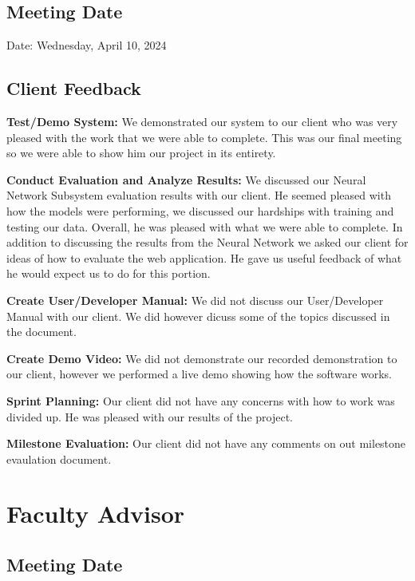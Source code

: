 \documentclass[12pt]{article}
\begin{document}
\subsection{Meeting Date}
Date: Wednesday, April 10, 2024
\subsection{Client Feedback}


\noindent\textbf{Test/Demo System:} We demonstrated our system to our client who was very pleased with the work that
we were able to complete. This was our final meeting so we were able to show him our project in its entirety.

\medskip

\noindent\textbf{Conduct Evaluation and Analyze Results:} We discussed our Neural Network Subsystem evaluation results with our
client. He seemed pleased with how the models were performing, we discussed our hardships with training and testing
our data. Overall, he was pleased with what we were able to complete. In addition to discussing the results from the 
Neural Network we asked our client for ideas of how to evaluate the web application. He gave us useful feedback of what
he would expect us to do for this portion.

\medskip

\noindent\textbf{Create User/Developer Manual:} We did not discuss our User/Developer Manual with our client. We did
however dicuss some of the topics discussed in the document.

\medskip

\noindent\textbf{Create Demo Video:} We did not demonstrate our recorded demonstration to our client, however we performed
a live demo showing how the software works.


\medskip

\noindent\textbf{Sprint Planning:} Our client did not have any concerns with how to work was divided up. He was
pleased with our results of the project.

\medskip

\noindent\textbf{Milestone Evaluation:} Our client did not have any comments on out milestone
evaulation document.



\section{Faculty Advisor}
\subsection{Meeting Date}
\end{document}
